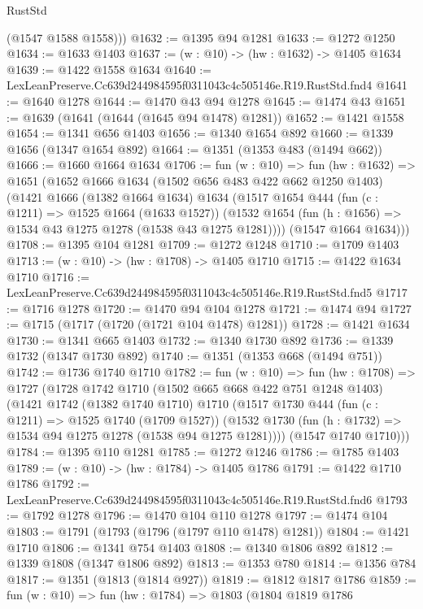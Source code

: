 \begin{lexlean}{RustStd}
\begin{coremodule}
        (@1547 @1588 @1558)))
@1632 := @1395 @94 @1281
@1633 := @1272 @1250
@1634 := @1633 @1403
@1637 := (w : @10) -> (hw : @1632) -> @1405 @1634
@1639 := @1422 @1558 @1634
@1640 := LexLeanPreserve.Cc639d244984595f0311043c4c505146e.R19.RustStd.fnd4
@1641 := @1640 @1278
@1644 := @1470 @43 @94 @1278
@1645 := @1474 @43
@1651 := @1639 (@1641 (@1644 (@1645 @94 @1478) @1281))
@1652 := @1421 @1558
@1654 := @1341 @656 @1403
@1656 := @1340 @1654 @892
@1660 := @1339 @1656 (@1347 @1654 @892)
@1664 := @1351 (@1353 @483 (@1494 @662))
@1666 := @1660 @1664 @1634
@1706 := fun (w : @10) =>
  fun (hw : @1632) =>
  @1651
    (@1652
      @1666
      @1634
      (@1502 @656 @483 @422 @662 @1250 @1403)
      (@1421
        @1666
        (@1382 @1664 @1634)
        @1634
        (@1517
          @1654
          @444
          (fun (c : @1211) => @1525 @1664 (@1633 @1527))
          (@1532 @1654 (fun (h : @1656) => @1534 @43 @1275 @1278 (@1538 @43 @1275 @1281))))
        (@1547 @1664 @1634)))
@1708 := @1395 @104 @1281
@1709 := @1272 @1248
@1710 := @1709 @1403
@1713 := (w : @10) -> (hw : @1708) -> @1405 @1710
@1715 := @1422 @1634 @1710
@1716 := LexLeanPreserve.Cc639d244984595f0311043c4c505146e.R19.RustStd.fnd5
@1717 := @1716 @1278
@1720 := @1470 @94 @104 @1278
@1721 := @1474 @94
@1727 := @1715 (@1717 (@1720 (@1721 @104 @1478) @1281))
@1728 := @1421 @1634
@1730 := @1341 @665 @1403
@1732 := @1340 @1730 @892
@1736 := @1339 @1732 (@1347 @1730 @892)
@1740 := @1351 (@1353 @668 (@1494 @751))
@1742 := @1736 @1740 @1710
@1782 := fun (w : @10) =>
  fun (hw : @1708) =>
  @1727
    (@1728
      @1742
      @1710
      (@1502 @665 @668 @422 @751 @1248 @1403)
      (@1421
        @1742
        (@1382 @1740 @1710)
        @1710
        (@1517
          @1730
          @444
          (fun (c : @1211) => @1525 @1740 (@1709 @1527))
          (@1532 @1730 (fun (h : @1732) => @1534 @94 @1275 @1278 (@1538 @94 @1275 @1281))))
        (@1547 @1740 @1710)))
@1784 := @1395 @110 @1281
@1785 := @1272 @1246
@1786 := @1785 @1403
@1789 := (w : @10) -> (hw : @1784) -> @1405 @1786
@1791 := @1422 @1710 @1786
@1792 := LexLeanPreserve.Cc639d244984595f0311043c4c505146e.R19.RustStd.fnd6
@1793 := @1792 @1278
@1796 := @1470 @104 @110 @1278
@1797 := @1474 @104
@1803 := @1791 (@1793 (@1796 (@1797 @110 @1478) @1281))
@1804 := @1421 @1710
@1806 := @1341 @754 @1403
@1808 := @1340 @1806 @892
@1812 := @1339 @1808 (@1347 @1806 @892)
@1813 := @1353 @780
@1814 := @1356 @784
@1817 := @1351 (@1813 (@1814 @927))
@1819 := @1812 @1817 @1786
@1859 := fun (w : @10) =>
  fun (hw : @1784) =>
  @1803
    (@1804
      @1819
      @1786

\end{coremodule}
\end{lexlean}
